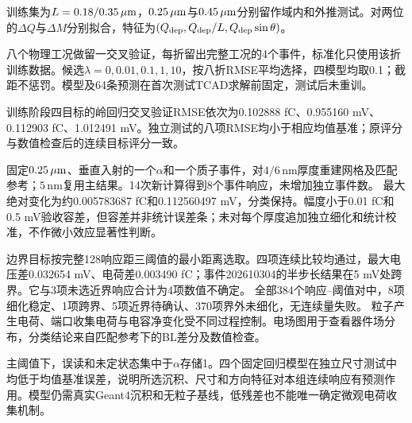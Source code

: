\documentclass[UTF8,a4paper,zihao=-4,fontset=fandol]{ctexart}
\begin{document}
训练集为$L=0.18/0.35\,\mu\mathrm{m}$，$0.25\,\mu\mathrm{m}$与$0.45\,\mu\mathrm{m}$分别留作域内和外推测试。对两位的$\Delta Q$与$\Delta M$分别拟合，特征为$(Q_{\rm dep},Q_{\rm dep}/L,Q_{\rm dep}\sin\theta)$。

八个物理工况做留一交叉验证，每折留出完整工况的4个事件，标准化只使用该折训练数据。候选$\lambda=0,0.01,0.1,1,10$，按八折RMSE平均选择，四模型均取0.1；截距不惩罚。模型及64条预测在首次测试TCAD求解前固定，测试后未重训。
\begin{table}[H]\centering\small\caption{独立测试误差。每行$n=16$，无缺失或无效响应。}\scoretable\end{table}
训练阶段四目标的岭回归交叉验证RMSE依次为0.102888 fC、0.955160 mV、0.112903 fC、1.012491 mV。独立测试的八项RMSE均小于相应均值基准；原评分与数值检查后的连续目标评分一致。

固定$0.25\,\mu\mathrm{m}$、垂直入射的一个$\alpha$和一个质子事件，对$4/6\,\mathrm{nm}$厚度重建网格及匹配参考；$5\,\mathrm{nm}$复用主结果。14次新计算得到8个事件响应，未增加独立事件数。
最大绝对变化为约0.005783687 fC和0.112560497 mV，分类保持。幅度小于0.01 fC和0.5 mV验收容差，但容差并非统计误差条；未对每个厚度追加独立细化和统计校准，不作微小效应显著性判断。

边界目标按完整128响应距三阈值的最小距离选取。四项连续比较均通过，最大电压差0.032654 mV、电荷差0.003490 fC；事件202610304的半步长结果在5 mV处跨界。它与3项未选近界响应合计为4项数值不确定。
全部384个响应--阈值对中，8项细化稳定、1项跨界、5项近界待确认、370项界外未细化，无连续量失败。
粒子产生电荷、端口收集电荷与电容净变化受不同过程控制。电场图用于查看器件场分布，分类结论来自匹配参考下的BL差分及数值检查。

主阈值下，误读和未定状态集中于$\alpha$存储1。四个固定回归模型在独立尺寸测试中均低于均值基准误差，说明所选沉积、尺寸和方向特征对本组连续响应有预测作用。模型仍需真实Geant4沉积和无粒子基线，低残差也不能唯一确定微观电荷收集机制。
\end{document}
